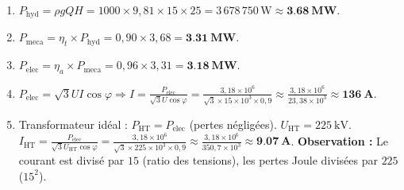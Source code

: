 \documentclass[11pt]{article}
\begin{document}
\begin{corrige}
\begin{enumerate}
    \item $P_{\text{hyd}} = \rho g Q H = 1000 \times 9,81 \times 15 \times 25 = 3\,678\,750\,\text{W} \approx \mathbf{\SI{3,68}{\mega\watt}}$.
    \item $P_{\text{meca}} = \eta_t \times P_{\text{hyd}} = 0,90 \times 3,68 = \mathbf{\SI{3,31}{\mega\watt}}$.
    \item $P_{\text{elec}} = \eta_a \times P_{\text{meca}} = 0,96 \times 3,31 = \mathbf{\SI{3,18}{\mega\watt}}$.
    \item $P_{\text{elec}} = \sqrt{3} U I \cos\varphi \Rightarrow I = \frac{P_{\text{elec}}}{\sqrt{3} U \cos\varphi} = \frac{3,18 \times 10^6}{\sqrt{3} \times 15 \times 10^3 \times 0,9} \approx \frac{3,18 \times 10^6}{23,38 \times 10^3} \approx \mathbf{\SI{136}{\ampere}}$.
    \item Transformateur idéal : $P_{\text{HT}} = P_{\text{elec}}$ (pertes négligées). $U_{\text{HT}} = \SI{225}{\kilo\volt}$.
    $I_{\text{HT}} = \frac{P_{\text{elec}}}{\sqrt{3} U_{\text{HT}} \cos\varphi} = \frac{3,18 \times 10^6}{\sqrt{3} \times 225 \times 10^3 \times 0,9} \approx \frac{3,18 \times 10^6}{350,7 \times 10^3} \approx \mathbf{\SI{9,07}{\ampere}}$.
    \textbf{Observation :} Le courant est divisé par $15$ (ratio des tensions), les pertes Joule divisées par $225$ ($15^2$).
\end{enumerate}
\end{corrige}
\end{document}

